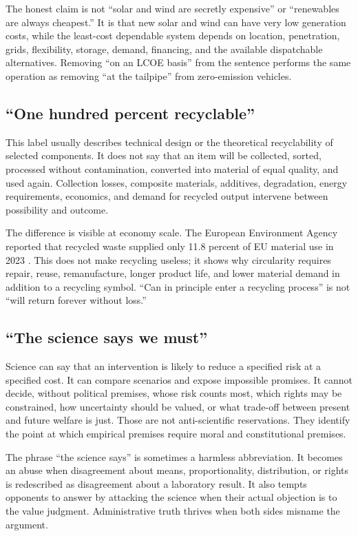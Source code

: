 ﻿\documentclass[12pt,a4paper]{book}
\begin{document}
The honest claim is not ``solar and wind are secretly expensive'' or
``renewables are always cheapest.''  It is that new solar and wind can have
very low generation costs, while the least-cost dependable system depends on
location, penetration, grids, flexibility, storage, demand, financing, and the
available dispatchable alternatives.  Removing ``on an LCOE basis'' from the
sentence performs the same operation as removing ``at the tailpipe'' from
zero-emission vehicles.

\subsection{``One hundred percent recyclable''}

This label usually describes technical design or the theoretical recyclability
of selected components.  It does not say that an item will be collected,
sorted, processed without contamination, converted into material of equal
quality, and used again.  Collection losses, composite materials, additives,
degradation, energy requirements, economics, and demand for recycled output
intervene between possibility and outcome.

The difference is visible at economy scale.  The European Environment Agency
reported that recycled waste supplied only 11.8 percent of EU material use in
2023 \cite{EEACircularMaterialUse2024}.  This does not make recycling useless;
it shows why circularity requires repair, reuse, remanufacture, longer product
life, and lower material demand in addition to a recycling symbol.  ``Can in
principle enter a recycling process'' is not ``will return forever without
loss.''

\subsection{``The science says we must''}

Science can say that an intervention is likely to reduce a specified risk at a
specified cost.  It can compare scenarios and expose impossible promises.  It
cannot decide, without political premises, whose risk counts most, which
rights may be constrained, how uncertainty should be valued, or what trade-off
between present and future welfare is just.  Those are not anti-scientific
reservations.  They identify the point at which empirical premises require
moral and constitutional premises.

The phrase ``the science says'' is sometimes a harmless abbreviation.  It
becomes an abuse when disagreement about means, proportionality, distribution,
or rights is redescribed as disagreement about a laboratory result.  It also
tempts opponents to answer by attacking the science when their actual
objection is to the value judgment.  Administrative truth thrives when both
sides misname the argument.
\end{document}
